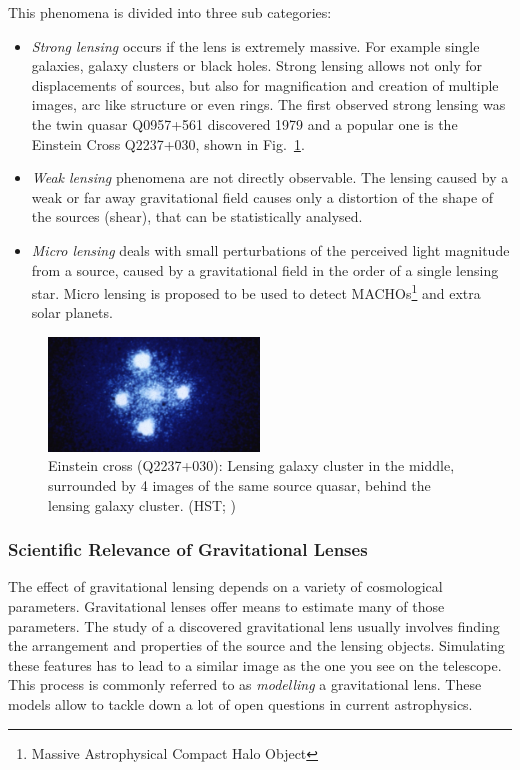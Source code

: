 \documentclass[11pt]{article}
\begin{document}
This phenomena is divided into three sub categories:
\begin{itemize}
  \item
    \emph{Strong lensing} occurs if the lens is extremely massive. For example single galaxies, galaxy clusters or black holes.
    Strong lensing allows not only for displacements of sources, but also for magnification and creation of multiple images, arc like structure or even rings.
    The first observed strong lensing was the twin quasar Q0957+561 discovered 1979\cite{walsh19790957} and a popular one is the Einstein Cross Q2237+030\cite{ec1985}, shown in Fig.~\ref{fig:einsteinc}.
  \item
    \emph{Weak lensing} phenomena are not directly observable.
    The lensing caused by a weak or far away gravitational field causes only a distortion of the shape of the sources (shear), that can be statistically analysed.
  \item
    \emph{Micro lensing} deals with small perturbations of the perceived light magnitude from a source, caused by a gravitational field in the order of a single lensing star.
    Micro lensing is proposed to be used to detect MACHOs\footnote{Massive Astrophysical Compact Halo Object} and extra solar planets.
\end{itemize}

\begin{figure}[h]
	\centering
		\includegraphics[width=0.5\textwidth]{img/einstein_cross}
	\caption{Einstein cross (Q2237+030): Lensing galaxy cluster in the middle, surrounded by 4 images of the same source quasar, behind the lensing galaxy cluster. (HST; \cite{ec1985})}
	\label{fig:einsteinc}
\end{figure}


\subsubsection{Scientific Relevance of Gravitational Lenses}

The effect of gravitational lensing depends on a variety of cosmological parameters.
Gravitational lenses offer means to estimate many of those parameters.
The study of a discovered gravitational lens usually involves finding the arrangement and properties of the source and the lensing objects.
Simulating these features has to lead to a similar image as the one you see on the telescope.
This process is commonly referred to as \emph{modelling} a gravitational lens.
These models allow to tackle down a lot of open questions in current astrophysics.
\end{document}
